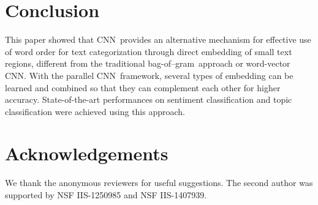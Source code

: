 \documentclass[11pt,letterpaper]{article}
\newcommand{\cnn}{CNN}
\newcommand{\bongram}{bag-of--gram}
\begin{document}
\section{Conclusion}
\label{sec:conclude}
This paper showed that \cnn\ provides an alternative mechanism for effective use of word order 
for text categorization through direct embedding of small text regions, 
different from the traditional \bongram\ approach or word-vector \cnn.  
With the parallel \cnn\ framework, several types of embedding 
can be learned and combined so that they can complement each other 
for higher accuracy.  
State-of-the-art performances on sentiment classification and topic classification were 
achieved using this approach. 

\section*{Acknowledgements}
We thank the anonymous reviewers for useful suggestions.  
The second author was supported by NSF IIS-1250985 and NSF IIS-1407939.  



\end{document}
